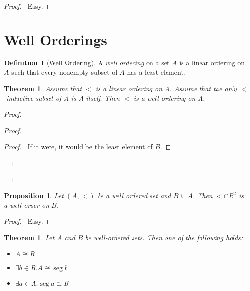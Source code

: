 \documentclass{report}
\let\qed\relax
\newtheorem{proposition}[axiom]{Proposition}
\newtheorem{theorem}[axiom]{Theorem}
\theoremstyle{definition}
\newtheorem{definition}[axiom]{Definition}
\newcommand{\seg}{\ensuremath{\operatorname{seg}}}
\begin{document}
    \begin{proof}
        \pf\ Easy. \qed
    \end{proof}

    \section{Well Orderings}

    \begin{definition}[Well Ordering]
        A \emph{well ordering} on a set $A$ is a linear ordering on $A$ such that every nonempty subset of
        $A$ has a least element.
    \end{definition}

    \begin{theorem}
        Assume that $<$ is a linear ordering on $A$. Assume that the only $<$-inductive subset of $A$ is $A$
        itself. Then $<$ is a well ordering on $A$.
    \end{theorem}

    \begin{proof}
        \pf
        \begin{proof}
            \step{b}{\assume{$\seg t \subseteq A - B$}}
            \begin{proof}
                \pf\ If it were, it would be the least element of $B$.
            \end{proof}
        \end{proof}
        \qed
    \end{proof}

    \begin{proposition}
        Let $(A, <)$ be a well ordered set and $B \subseteq A$. Then $< \cap B^2$ is a well order on $B$.
    \end{proposition}

    \begin{proof}
        \pf\ Easy. \qed
    \end{proof}
    
    \begin{theorem}
        \label{theorem:well_ordered_trichotomy}
        Let $A$ and $B$ be well-ordered sets. Then one of the following holds:
        \begin{itemize}
            \item $A \cong B$
            \item $\exists b \in B. A \cong \seg b$
            \item $\exists a \in A. \seg a \cong B$
        \end{itemize}
    \end{theorem}
\end{document}
